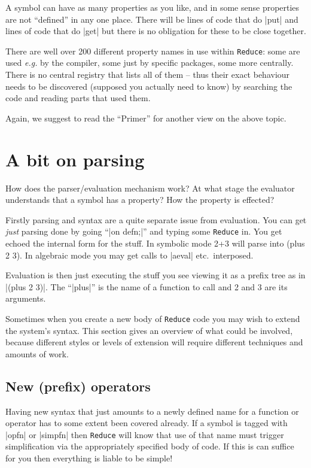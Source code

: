 \documentclass[12pt,twoside,openright]{memoir}
\newcommand{\reduce}{\texttt{Reduce}\xspace}
\begin{document}
A symbol can have as many properties as you like, and in some sense properties
are not ``defined'' in any one place. There will be lines of code that do |put|
and lines of code that do |get| but there is no obligation for these to be close
together.

There are  well over 200 different property names in use within \reduce:
some are used
\emph{e.g.} by the compiler, some just by specific packages, some more
centrally. There is no central registry that lists all of them -- thus
their exact behaviour needs to be discovered (supposed you actually need to
know) by searching the code and reading parts that used them.

Again, we suggest to read the ``Primer'' \cite{melenk} for another view on the
above topic.

\section{A bit on parsing}

How does the parser/evaluation mechanism work? At what stage the evaluator
understands that a symbol has a property? How the property is effected?

Firstly parsing and syntax are a quite separate issue from evaluation. You can
get {\em just} parsing done by going ``|on defn;|'' and typing some \reduce
in. You get echoed the internal form for the stuff. In symbolic mode 2+3 will
parse into (plus 2 3). In algebraic mode you may get calls to |aeval| etc.\
interposed.

Evaluation is then just executing the stuff you see viewing it as a prefix tree
as in |(plus 2 3)|. The ``|plus|'' is the name of a function to call and 2 and 3
are its arguments.

Sometimes when you create a new body of \reduce code you may wish to extend
the system's syntax. This section gives an overview of what could be involved,
because different styles or levels of extension will require different
techniques and amounts of work.

\subsection{New (prefix) operators}

Having new syntax that just amounts to a newly defined name for a
function or operator has to some extent been covered already. If a
symbol is tagged with |opfn| or |simpfn| then \reduce will know that use of
that name must trigger simplification via the appropriately specified body of
code. If this is can suffice for you then everything is liable to be simple!
\end{document}
